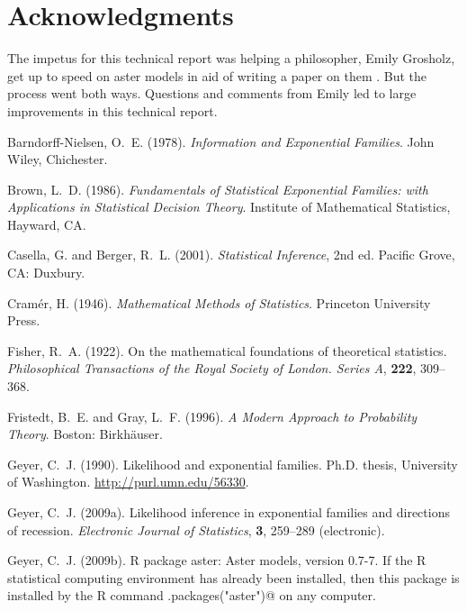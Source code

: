 \documentclass[11pt]{article}
\begin{document}
\section*{Acknowledgments}

The impetus for this technical report was helping a philosopher,
Emily Grosholz, get up to speed on aster models in aid of writing a paper
on them \citep{grosholz}.  But the process went both ways.  Questions and
comments from Emily led to large improvements in this technical report.

\begin{thebibliography}{}

Barndorff-Nielsen, O.~E. (1978).
\newblock \emph{Information and Exponential Families}.
\newblock John Wiley, Chichester.

Brown, L.~D. (1986).
\newblock \emph{Fundamentals of Statistical Exponential Families: with
  Applications in Statistical Decision Theory}.
\newblock Institute of Mathematical Statistics, Hayward, CA.

Casella, G. and Berger, R.~L. (2001).
\newblock \emph{Statistical Inference}, 2nd ed.
\newblock Pacific Grove, CA: Duxbury.

Cram\'{e}r, H. (1946).
\newblock \emph{Mathematical Methods of Statistics}.
\newblock Princeton University Press.

Fisher, R.~A. (1922).
\newblock On the mathematical foundations of theoretical statistics.
\newblock \emph{Philosophical Transactions of the Royal Society of London.
    Series A}, \textbf{222}, 309--368.

Fristedt, B.~E. and Gray, L.~F. (1996).
\newblock \emph{A Modern Approach to Probability Theory}.
\newblock Boston: Birkh\"{a}user.

Geyer, C.~J. (1990).
\newblock Likelihood and exponential families.
\newblock Ph.D. thesis, University of Washington.
\newblock \url{http://purl.umn.edu/56330}.

Geyer, C.~J. (2009a).
\newblock Likelihood inference in exponential families and directions of
    recession.
\newblock \emph{Electronic Journal of Statistics}, \textbf{3}, 259--289
    (electronic).

Geyer, C.~J. (2009b).
\newblock R package aster: Aster models, version 0.7-7.
\newblock If the R statistical computing environment \citep{rcore}
has already been installed, then this package is installed
by the R command \verb@install.packages("aster")@ on any computer.


\end{thebibliography}
\end{document}
